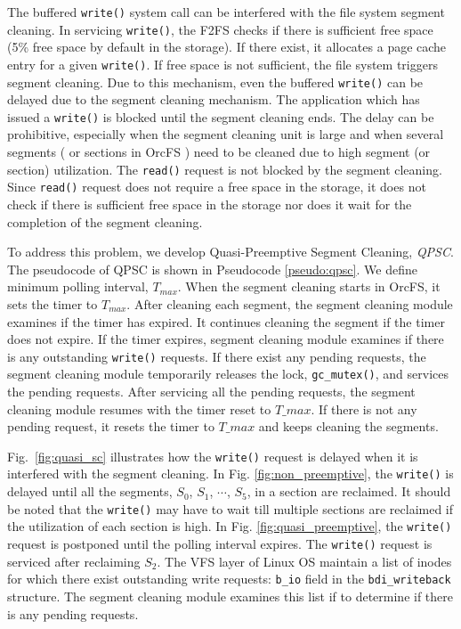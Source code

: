\documentclass[prodmode,acmtecs]{acmsmall}
\begin{document}
The buffered \texttt{write()} system call can be interfered with the
file system segment cleaning. In servicing \texttt{write()}, the F2FS
checks if there is sufficient free space (5\% free space by default in
the storage). If there exist, it allocates a page cache entry for a
given \texttt{write()}. If free space is not sufficient, the
file system triggers segment cleaning. Due to this mechanism, even the
buffered \texttt{write()} can be delayed due to the segment cleaning
mechanism. The application which has issued a \texttt{write()} is
blocked until the segment cleaning ends. The delay can be prohibitive,
especially when the segment cleaning unit is large and when several
segments ( or sections in OrcFS ) need to be cleaned due to high
segment (or section) utilization. 
The \texttt{read()} request is not blocked by the segment cleaning. 
Since \texttt{read()} request does not require a free space in the storage, 
it does not check if there is sufficient free space in the storage nor does 
it wait for the completion of the segment cleaning.

To address this problem, we develop Quasi-Preemptive Segment Cleaning,
\emph{QPSC}. The pseudocode of QPSC is shown in Pseudocode
\ref{pseudo:qpsc}. We define minimum polling interval, $T_{max}$. When
the segment cleaning starts in OrcFS, it sets the timer to
$T_{max}$. After cleaning each segment, the segment cleaning module
examines if the timer has expired. It continues cleaning the segment
if the timer does not expire. If the timer expires, segment cleaning
module examines if there is any outstanding \texttt{write()}
requests. If there exist any pending requests, the segment cleaning
module temporarily releases the lock, \texttt{gc\_mutex()}, and
services the pending requests. After servicing all the pending
requests, the segment cleaning module resumes with the timer reset to
$T\_{max}$. If there is not any pending request, it resets the timer
to $T\_{max}$ and keeps cleaning the segments.

Fig.~\ref{fig:quasi_sc} illustrates 
how the \texttt{write()} request is delayed when it is interfered with
the segment cleaning. In Fig. \ref{fig:non_preemptive}, the
\texttt{write()} is delayed until all the segments, $S_0$, $S_1$,
$\cdots$, $S_5$, in a section are reclaimed. It should be noted that the
\texttt{write()} may have to wait till multiple sections are reclaimed
if the utilization of each section is high. In Fig. \ref{fig:quasi_preemptive}, the \texttt{write()} request is postponed until
the polling interval expires. The \texttt{write()} request is serviced
after reclaiming $S_2$.  The VFS layer of Linux OS maintain a list of
inodes for which there exist outstanding write requests:
\texttt{b\_io} field in the \texttt{bdi\_writeback} structure. The
segment cleaning module examines this list if to determine if there is
any pending requests.
\end{document}
